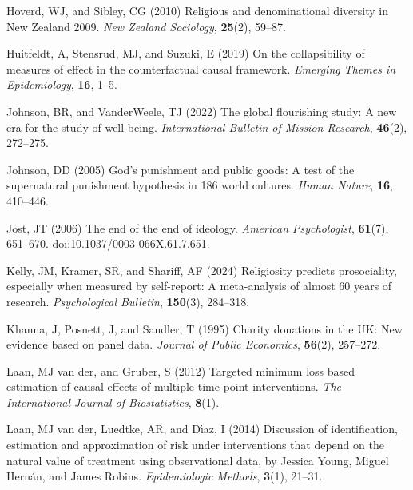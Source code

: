 \documentclass[
  single column]{article}
\newlength{\cslhangindent}
\newenvironment{CSLReferences}[2] %
 {\begin{list}{}{%
  \setlength{\itemindent}{0pt}
  \setlength{\leftmargin}{0pt}
  \setlength{\parsep}{0pt}
  \ifodd #1
   \setlength{\leftmargin}{\cslhangindent}
   \setlength{\itemindent}{-1\cslhangindent}
  \fi
  \setlength{\itemsep}{#2\baselineskip}}}
 {\end{list}}
\begin{document}
\begin{CSLReferences}{1}{0}
Hoverd, WJ, and Sibley, CG (2010) Religious and denominational diversity
in {N}ew {Z}ealand 2009. \emph{New Zealand Sociology}, \textbf{25}(2),
59--87.

Huitfeldt, A, Stensrud, MJ, and Suzuki, E (2019) On the collapsibility
of measures of effect in the counterfactual causal framework.
\emph{Emerging Themes in Epidemiology}, \textbf{16}, 1--5.

Johnson, BR, and VanderWeele, TJ (2022) The global flourishing study: A
new era for the study of well-being. \emph{International Bulletin of
Mission Research}, \textbf{46}(2), 272--275.

Johnson, DD (2005) God{'}s punishment and public goods: A test of the
supernatural punishment hypothesis in 186 world cultures. \emph{Human
Nature}, \textbf{16}, 410--446.

Jost, JT (2006) The end of the end of ideology. \emph{American
Psychologist}, \textbf{61}(7), 651--670.
doi:\href{https://doi.org/10.1037/0003-066X.61.7.651}{10.1037/0003-066X.61.7.651}.

Kelly, JM, Kramer, SR, and Shariff, AF (2024) Religiosity predicts
prosociality, especially when measured by self-report: A meta-analysis
of almost 60 years of research. \emph{Psychological Bulletin},
\textbf{150}(3), 284--318.

Khanna, J, Posnett, J, and Sandler, T (1995) Charity donations in the
UK: New evidence based on panel data. \emph{Journal of Public
Economics}, \textbf{56}(2), 257--272.

Laan, MJ van der, and Gruber, S (2012) Targeted minimum loss based
estimation of causal effects of multiple time point interventions.
\emph{The International Journal of Biostatistics}, \textbf{8}(1).

Laan, MJ van der, Luedtke, AR, and Dı́az, I (2014) Discussion of
identification, estimation and approximation of risk under interventions
that depend on the natural value of treatment using observational data,
by {J}essica {Y}oung, {M}iguel {H}ern{á}n, and {J}ames {R}obins.
\emph{Epidemiologic Methods}, \textbf{3}(1), 21--31.


\end{CSLReferences}
\end{document}
